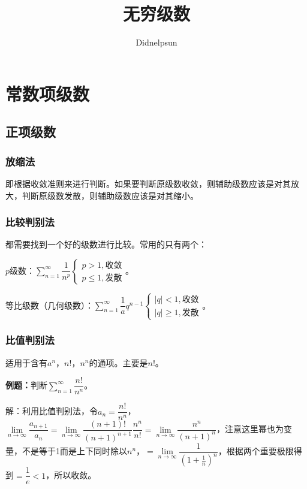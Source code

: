 \documentclass[UTF8, 12pt]{ctexart}
\author{Didnelpsun}
\title{无穷级数}
\date{}
\begin{document}
\maketitle
\pagestyle{empty}
\thispagestyle{empty}
\tableofcontents
\thispagestyle{empty}
\newpage
\pagestyle{plain}
\setcounter{page}{1}
\section{常数项级数}

\subsection{正项级数}

\subsubsection{放缩法}

即根据收敛准则来进行判断。如果要判断原级数收敛，则辅助级数应该是对其放大，判断原级数发散，则辅助级数应该是对其缩小。

\subsubsection{比较判别法}

都需要找到一个好的级数进行比较。常用的只有两个：

$p$级数：$\sum\limits_{n=1}^\infty\dfrac{1}{n^p}\left\{\begin{array}{l}
    p>1, \text{收敛} \\
    p\leqslant1, \text{发散}
\end{array}\right.$。

等比级数（几何级数）：$\sum\limits_{n=1}^\infty\dfrac{1}aq^{n-1}\left\{\begin{array}{l}
    \vert q\vert<1, \text{收敛} \\
    \vert q\vert\geqslant 1, \text{发散}
\end{array}\right.$。

\subsubsection{比值判别法}

适用于含有$a^n$，$n!$，$n^n$的通项。主要是$n!$。

\textbf{例题：}判断$\sum\limits_{n=1}^\infty\dfrac{n!}{n^n}$。

解：利用比值判别法，令$a_n=\dfrac{n!}{n^n}$，$\lim\limits_{n\to\infty}\dfrac{a_{n+1}}{a_n}=\lim\limits_{n\to\infty}\dfrac{(n+1)!}{(n+1)^{n+1}}\dfrac{n^n}{n!}=\lim\limits_{n\to\infty}\dfrac{n^n}{(n+1)^n}$，注意这里幂也为变量，不是等于1而是上下同时除以$n^n$，$=\lim\limits_{n\to\infty}\dfrac{1}{(1+\frac{1}{n})^n}$，根据两个重要极限得到$=\dfrac{1}{e}<1$，所以收敛。
\end{document}
